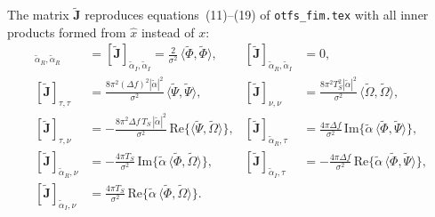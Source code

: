 \documentclass[11pt]{article}
\begin{document}
The matrix \(\tilde{\bm{J}}\) reproduces equations~(11)--(19) of \texttt{otfs\_fim.tex} with all inner products formed from \(\hat{x}\) instead of \(x\):
\begin{align}
    [\tilde{\bm{J}}]_{\tilde{\alpha}_R, \tilde{\alpha}_R} &= [\tilde{\bm{J}}]_{\tilde{\alpha}_I, \tilde{\alpha}_I} = \tfrac{2}{\sigma^2}\,\langle \tilde{\Phi},\tilde{\Phi}\rangle, &
    [\tilde{\bm{J}}]_{\tilde{\alpha}_R, \tilde{\alpha}_I} &= 0, \\
    [\tilde{\bm{J}}]_{\tau, \tau} &= \tfrac{8\pi^2 (\Delta f)^2 |\tilde{\alpha}|^2}{\sigma^2}\, \langle \tilde{\Psi},\tilde{\Psi}\rangle, &
    [\tilde{\bm{J}}]_{\nu, \nu} &= \tfrac{8\pi^2 T_S^2 |\tilde{\alpha}|^2}{\sigma^2}\, \langle \tilde{\Omega},\tilde{\Omega}\rangle, \\
    [\tilde{\bm{J}}]_{\tau, \nu} &= -\tfrac{8\pi^2 \Delta f\, T_S\, |\tilde{\alpha}|^2}{\sigma^2}\, \mathrm{Re}\{\langle \tilde{\Psi},\tilde{\Omega}\rangle\}, &
    [\tilde{\bm{J}}]_{\tilde{\alpha}_R, \tau} &= \tfrac{4\pi\Delta f}{\sigma^2}\, \mathrm{Im}\{\tilde{\alpha}\, \langle \tilde{\Phi},\tilde{\Psi}\rangle\}, \\
    [\tilde{\bm{J}}]_{\tilde{\alpha}_R, \nu} &= -\tfrac{4\pi T_S}{\sigma^2}\, \mathrm{Im}\{\tilde{\alpha}\, \langle \tilde{\Phi},\tilde{\Omega}\rangle\}, &
    [\tilde{\bm{J}}]_{\tilde{\alpha}_I, \tau} &= -\tfrac{4\pi\Delta f}{\sigma^2}\, \mathrm{Re}\{\tilde{\alpha}\, \langle \tilde{\Phi},\tilde{\Psi}\rangle\}, \\
    [\tilde{\bm{J}}]_{\tilde{\alpha}_I, \nu} &= \tfrac{4\pi T_S}{\sigma^2}\, \mathrm{Re}\{\tilde{\alpha}\, \langle \tilde{\Phi},\tilde{\Omega}\rangle\}. & &
\end{align}
\end{document}
